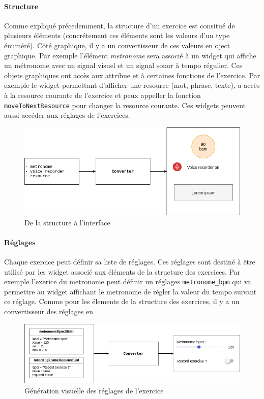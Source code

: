 \paragraph{Structure}
Comme expliqué précedemment, la structure d'un exercice est consitué de plusieurs éléments (concrétement ces éléments sont les valeurs d'un type énuméré). Côté graphique, il y a un convertisseur de ces valeurs en oject graphique. Par exemple l'élément \textit{metronome} sera associé à un widget qui affiche un métronome avec un signal visuel et un signal sonor à tempo régulier. Ces objets graphiques  ont accès aux attribue et à certaines fonctions de l'exercice. Par exemple le widget permettant d'afficher une resource (mot, phrase, texte), a accès à la resource courante de l'exercice et peux appeller la fonction \texttt{moveToNextResource} pour changer la resource courante. Ces widgets peuvent aussi accéder aux réglages de l'exercices.

\begin{figure}[H]
  \includegraphics[width=0.8\linewidth]{content/imgs/struc.png}
  \caption{De la structure à l'interface}
  \label{fig:struc}
\end{figure}

\paragraph{Réglages}
Chaque exercice peut définir sa liste de réglages. Ces réglages sont destiné à être utilisé par les widget associé aux éléments de la structure des exercices. Par exemple l'exerice du metronome peut définir un réglages \texttt{metronome\_bpm} qui va permettre au widget affichant le metronome de régler la valeur du tempo suivant ce réglage. Comme pour les élements de la structure des exercices, il y a un convertisseur des réglages en

\begin{figure}[H]
  \includegraphics[width=0.8\linewidth]{content/imgs/settings.png}
  \caption{Génération visuelle des réglages de l'exercice}
  \label{fig:settings}
\end{figure}

